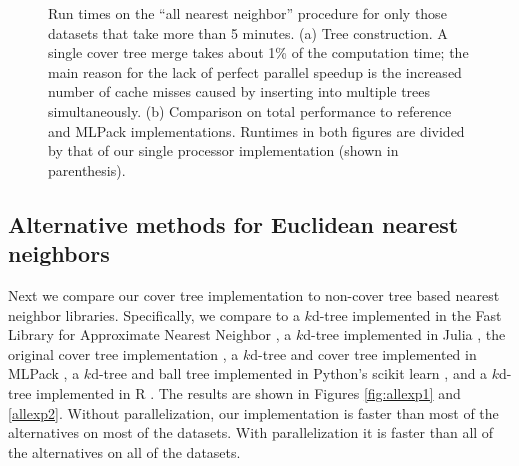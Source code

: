 \documentclass[thesis.tex]{subfiles}
\begin{document}

\begin{figure*}
\centering
\subfigure[]{\small
\resizebox{2.5in}{1.8in}{}
}
\subfigure[]{\small
\resizebox{2.5in}{1.8in}{}
}
\caption{
    Run times on the ``all nearest neighbor'' procedure for only those datasets that take more than 5 minutes.
    (a) Tree construction. %
    A single cover tree merge takes about 1\% of the computation time;
    the main reason for the lack of perfect parallel speedup is the increased number of cache misses caused by inserting into multiple trees simultaneously.
    (b) Comparison on total performance to reference and MLPack implementations. %
    Runtimes in both figures are divided by that of our single processor implementation (shown in parenthesis).
    }
\label{fig:parallel}
\end{figure*}


\subsection{Alternative methods for Euclidean nearest neighbors}

Next we compare our cover tree implementation to non-cover tree based nearest neighbor libraries.
Specifically, we compare to a $k$d-tree implemented in the Fast Library for Approximate Nearest Neighbor \citep[FLANN; ][]{muja2014scalable},
a $k$d-tree implemented in Julia \citep{bezanson2017julia},
the original cover tree implementation \citep{beygelzimer2006cover},
a $k$d-tree and cover tree implemented in MLPack \citep{curtin2013mlpack},
a $k$d-tree and ball tree implemented in Python's scikit learn \citep{scikit-learn},
and a $k$d-tree implemented in R \citep{R}.
The results are shown in Figures \ref{fig:allexp1} and \ref{allexp2}.
Without parallelization, our implementation is faster than most of the alternatives on most of the datasets.
With parallelization it is faster than all of the alternatives on all of the datasets.
\end{document}
